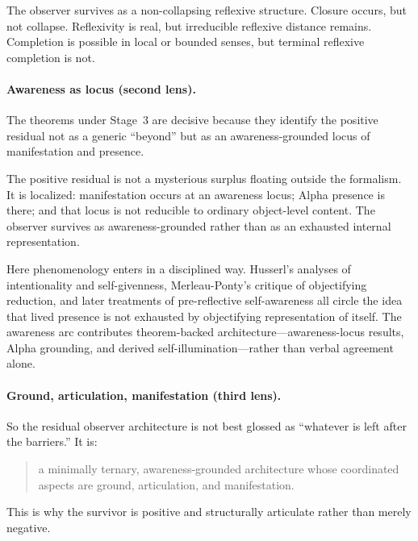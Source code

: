 \documentclass[11pt]{article}
\theoremstyle{plain}
\theoremstyle{definition}
\theoremstyle{remark}
\begin{document}
\begin{keybox}[title={First positive survivor}]
The observer survives as a non-collapsing reflexive structure.  Closure
occurs, but not collapse.  Reflexivity is real, but irreducible reflexive
distance remains.  Completion is possible in local or bounded senses,
but terminal reflexive completion is not.
\end{keybox}

\paragraph{Awareness as locus (second lens).}
The theorems under Stage~3 are decisive because they identify the positive
residual not as a generic ``beyond'' but as an awareness-grounded locus of
manifestation and presence.

\begin{keybox}[title={Awareness-grounded residual}]
The positive residual is not a mysterious surplus floating outside the
formalism.  It is localized: manifestation occurs at an awareness locus;
Alpha presence is there; and that locus is not reducible to ordinary
object-level content.  The observer survives as awareness-grounded rather
than as an exhausted internal representation.
\end{keybox}

Here phenomenology enters in a disciplined way.  Husserl's analyses of
intentionality and self-givenness, Merleau-Ponty's critique of objectifying
reduction, and later treatments of pre-reflective self-awareness all
circle the idea that lived presence is not exhausted by objectifying
representation of itself.  The awareness arc contributes theorem-backed
architecture---awareness-locus results, Alpha grounding, and derived
self-illumination---rather than verbal agreement alone.

\paragraph{Ground, articulation, manifestation (third lens).}
So the residual observer architecture is not best glossed as ``whatever is
left after the barriers.''  It is:
\begin{quote}
a minimally ternary, awareness-grounded architecture whose coordinated
aspects are ground, articulation, and manifestation.
\end{quote}
This is why the survivor is positive and structurally articulate rather
than merely negative.
\end{document}
